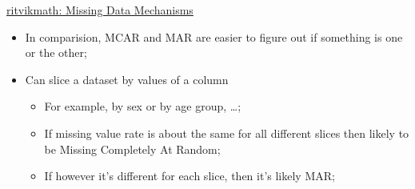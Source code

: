\documentclass[12pt, titlepage, french]{report}
\begin{document}
\begin{YTB_SUMM_AUTO_NUMB}[label = {rvm-MCAR-etal}]{\href{https://www.youtube.com/watch?v=XnnA9z7lv4Q}{ritvikmath: Missing Data Mechanisms
}}
\begin{itemize}[leftmargin = *]
\begin{itemize}
		\end{itemize}
	\begin{itemize}
	\item	In comparision, MCAR and MAR are easier to figure out if something is one or the other;
	\item	Can slice a dataset by values of a column
		\begin{itemize}
		\item	For example, by sex or by age group, \dots;
		\item	If missing value rate is about the same for all different slices then likely to be Missing Completely At Random;
		\item	If however it's different for each slice, then it's likely MAR;
		\end{itemize}
	\end{itemize}
\end{itemize}
\end{YTB_SUMM_AUTO_NUMB}
\end{document}
